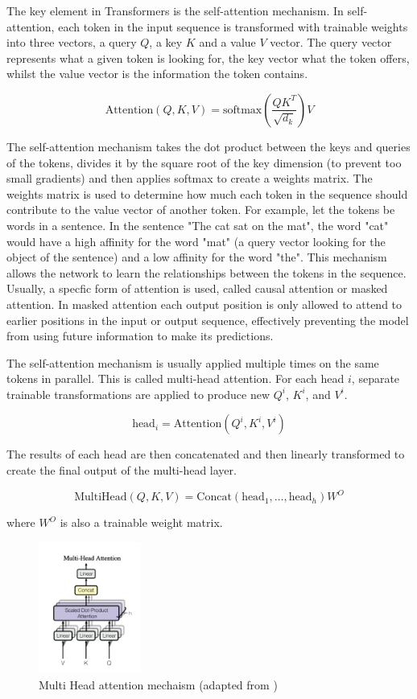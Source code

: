 \documentclass[11pt]{article}
\begin{document}
The key element in Transformers is the self-attention mechanism. In self-attention, each token in the input sequence is transformed with trainable weights into three vectors, a query $Q$, a key $K$ and a value $V$ vector. The query vector represents what a given token is looking for, the key vector what the token offers, whilst the value vector is the information the token contains.

$$\text{Attention}(Q, K , V) = \text{softmax}\left(\frac{QK^T}{\sqrt{d_k}}\right)V$$

The self-attention mechanism takes the dot product between the keys and queries of the tokens, divides it by the square root of the key dimension (to prevent too small gradients) and then applies softmax to create a weights matrix. The weights matrix is used to determine how much each token in the sequence should contribute to the value vector of another token. For example, let the tokens be words in a sentence. In the sentence "The cat sat on the mat", the word "cat" would have a high affinity for the word "mat" (a query vector looking for the object of the sentence) and a low affinity for the word "the". This mechanism allows the network to learn the relationships between the tokens in the sequence. Usually, a specfic form of attention is used, called causal attention or masked attention. In masked attention each output position is only allowed to attend to earlier positions in the input or output sequence, effectively preventing the model from using future information to make its predictions.

The self-attention mechanism is usually applied multiple times on the same tokens in parallel. This is called multi-head attention. For each head $i$, separate trainable transformations are applied to produce new $Q^i$, $K^i$, and $V^i$.

$$\text{head}_i = \text{Attention}(Q^i, K^i, V^i)$$

The results of each head are then concatenated and then linearly transformed to create the final output of the multi-head layer.

$$\text{MultiHead}(Q, K, V) = \text{Concat}(\text{head}_1, \ldots, \text{head}_h)W^O$$

where $W^O$ is also a trainable weight matrix.

\begin{figure}[h]
\centering
\includegraphics[width=0.3\textwidth]{multi-head.png}
\caption{Multi Head attention mechaism (adapted from \cite{DBLP:journals/corr/VaswaniSPUJGKP17})}
\end{figure}
\end{document}
